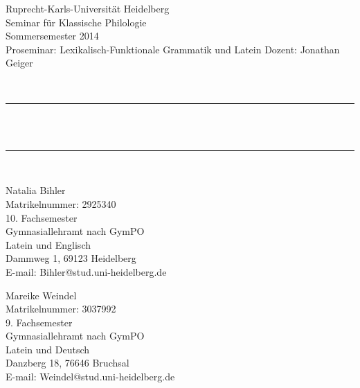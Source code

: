 \begin{titlepage}

\begin{center}


\begin{minipage}{0.55\textwidth}
\begin{flushleft} \small
Ruprecht-Karls-Universität Heidelberg\\
Seminar für Klassische Philologie\\
Sommersemester 2014\\
Proseminar: Lexikalisch-Funktionale Grammatik und Latein
Dozent: Jonathan Geiger\\ 
\end{flushleft}
\end{minipage}
\begin{minipage}{0.4\textwidth}
\begin{flushright} \large

\end{flushright}
\end{minipage}
\\[4cm]
\rule{\textwidth}{0.4pt}\\[0.4cm]


 \\[0.1cm]

\rule{\textwidth}{0.4pt}\\[4cm]

\begin{minipage}{0.48\textwidth}
\begin{flushleft} \small
Natalia Bihler\\
Matrikelnummer: 2925340\\
10. Fachsemester\\
Gymnasiallehramt nach GymPO\\
Latein und Englisch\\
Dammweg 1, 69123 Heidelberg\\
E-mail: Bihler@stud.uni-heidelberg.de
\end{flushleft}
\end{minipage}
\begin{minipage}{0.48\textwidth}
\begin{flushright} \small
Mareike Weindel\\
Matrikelnummer: 3037992\\
9. Fachsemester\\
Gymnasiallehramt nach GymPO\\
Latein und Deutsch\\
Danzberg 18, 76646 Bruchsal\\
E-mail: Weindel@stud.uni-heidelberg.de
\end{flushright}
\end{minipage}


\end{center}
\end{titlepage}
